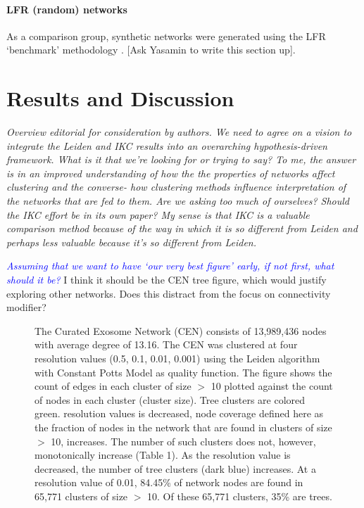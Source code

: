 \documentclass[12pt, oneside]{article}   	%
\begin{document}
\paragraph{LFR (random) networks}
As a comparison group, synthetic networks were generated using the LFR `benchmark' methodology \citep{Lancichinetti2008}. [Ask Yasamin to write this section up].

\section{Results and Discussion}

\emph{Overview editorial for consideration by authors. We need to agree on a vision to integrate the Leiden and IKC results into an overarching hypothesis-driven framework. What is it that we're looking for or trying to say? To me, the answer is in an improved understanding of how the the properties of networks affect clustering and the converse- how clustering methods influence interpretation of the networks that are fed to them. Are we asking too much of ourselves? Should the IKC effort be in its own paper? My sense is that IKC is a valuable comparison method because of the way in which it is so different from Leiden and perhaps less valuable because it's so different from Leiden.}

\textcolor{blue}{\emph{Assuming that we want to have `our very best figure' early, if not first, what should it be?}} I think it should be the CEN tree figure, which would justify exploring other networks.  Does this distract from the focus on connectivity modifier?

\begin{figure}[H]
\centering

\caption{The Curated Exosome Network (CEN) consists of 13,989,436 nodes with average degree of 13.16. The CEN was clustered at four resolution values (0.5, 0.1, 0.01, 0.001) using the Leiden algorithm with Constant Potts Model as quality function. The figure shows the count of edges in each cluster of size $>$  10 plotted against the count of nodes in each cluster (cluster size). Tree clusters are colored green.  resolution values is decreased, node coverage defined here as the fraction of nodes in the network that are found in clusters of size $>$  10, increases. The number of such clusters does not, however, monotonically increase (Table 1). As the resolution value is decreased, the number of tree clusters (dark blue) increases. At a resolution value of 0.01, 84.45\% of network nodes are found in 65,771 clusters of size $>$ 10. Of these 65,771 clusters, 35\% are trees.}
\end{figure}
\end{document}
